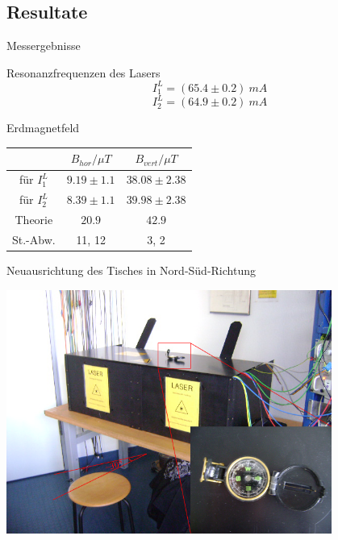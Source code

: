 \documentclass{beamer}
\begin{document}
\subsection{Resultate}
\begin{frame}{Messergebnisse}
\begin{block}{Resonanzfrequenzen des Lasers} %
$$I_1^L = (65.4 \pm 0.2)\ mA$$
$$I_2^L = (64.9 \pm 0.2)\ mA$$
\end{block}
\begin{exampleblock}{Erdmagnetfeld}
\begin{center}
\begin{tabular}[H]{c c c}
 & $B_{hor}/\mu T$ & $B_{vert}/\mu T$ \\ \hline
für $I_1^L$ & $9.19 \pm 1.1$ & $38.08 \pm 2.38$\\
für $I_2^L$& $8.39 \pm 1.1$ & $39.98 \pm 2.38$\\
Theorie & $20.9$ & $42.9$\\
St.-Abw. & 11, 12 & 3, 2\\
\end{tabular}
\end{center}
\end{exampleblock}
\end{frame}

\begin{frame}{Neuausrichtung des Tisches in Nord-Süd-Richtung}
\begin{center}
\centering \includegraphics[width=0.8\textwidth]{Bilder/Nordsued.png}
\end{center}
\end{frame}
\end{document}
